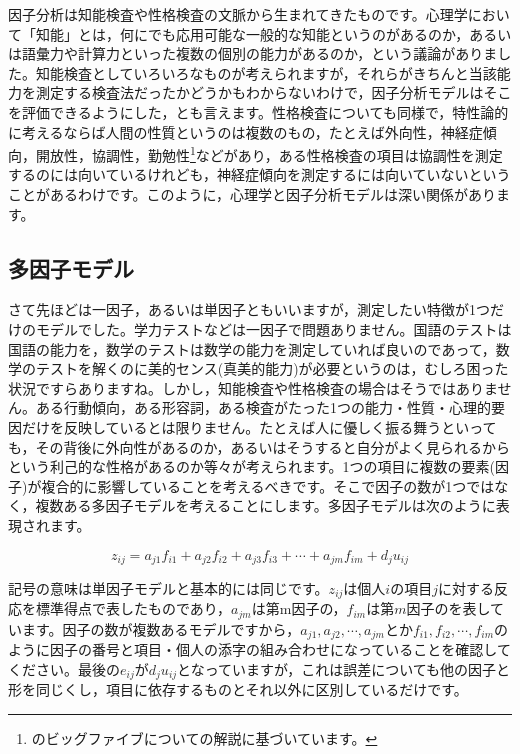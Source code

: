 \documentclass{ltjsbook}
\begin{document}
因子分析は知能検査や性格検査の文脈から生まれてきたものです。心理学において「知能」とは，何にでも応用可能な一般的な知能というのがあるのか，あるいは語彙力や計算力といった複数の個別の能力があるのか，という議論がありました。知能検査としていろいろなものが考えられますが，それらがきちんと当該能力を測定する検査法だったかどうかもわからないわけで，因子分析モデルはそこを評価できるようにした，とも言えます。性格検査についても同様で，特性論的に考えるならば人間の性質というのは複数のもの，たとえば外向性，神経症傾向，開放性，協調性，勤勉性\footnote{\citet{Oshio2020}のビッグファイブについての解説に基づいています。}などがあり，ある性格検査の項目は協調性を測定するのには向いているけれども，神経症傾向を測定するには向いていないということがあるわけです。このように，心理学と因子分析モデルは深い関係があります。

\subsection{多因子モデル}
さて先ほどは一因子，あるいは単因子ともいいますが，測定したい特徴が1つだけのモデルでした。学力テストなどは一因子で問題ありません。国語のテストは国語の能力を，数学のテストは数学の能力を測定していれば良いのであって，数学のテストを解くのに美的センス(真美的能力)が必要というのは，むしろ困った状況ですらありますね。しかし，知能検査や性格検査の場合はそうではありません。ある行動傾向，ある形容詞，ある検査がたった1つの能力・性質・心理的要因だけを反映しているとは限りません。たとえば人に優しく振る舞うといっても，その背後に外向性があるのか，あるいはそうすると自分がよく見られるからという利己的な性格があるのか等々が考えられます。1つの項目に複数の要素(因子)が複合的に影響していることを考えるべきです。そこで因子の数が1つではなく，複数ある多因子モデルを考えることにします。多因子モデルは次のように表現されます。

\begin{equation}
    z_{ij} = a_{j1}f_{i1} + a_{j2}f_{i2}+a_{j3}f_{i3} + \cdots + a_{jm}f_{im} + d_j u_{ij}
    \label{factor}
\end{equation}

記号の意味は単因子モデルと基本的には同じです。$z_{ij}$は個人$i$の項目$j$に対する反応を標準得点で表したものであり，$a_{jm}$は第m因子の，$f_{im}$は第$m$因子のを表しています。因子の数が複数あるモデルですから，$a_{j1},a_{j2},\cdots, a_{jm}$とか$f_{i1},f_{i2},\cdots, f_{im}$のように因子の番号と項目・個人の添字の組み合わせになっていることを確認してください。最後の$e_{ij}$が$d_j u_{ij}$となっていますが，これは誤差についても他の因子と形を同じくし，項目に依存するものとそれ以外に区別しているだけです。
\end{document}
